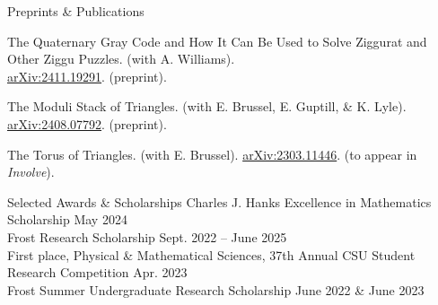 \documentclass[
	11pt, %
]{cv} %
\begin{document}
\begin{rSectionNumbered}{Preprints \& Publications}
	\item The Quaternary Gray Code and How It Can Be Used to Solve Ziggurat and Other Ziggu Puzzles. (with A. Williams).\\ \href{http://arxiv.org/abs/2411.19291}{arXiv:2411.19291}. (preprint).
	\item The Moduli Stack of Triangles. (with E. Brussel, E. Guptill, \& K. Lyle). \href{http://arxiv.org/abs/2408.07792}{arXiv:2408.07792}. (preprint).
	\item The Torus of Triangles. (with E. Brussel). \href{http://arxiv.org/abs/2303.11446}{arXiv:2303.11446}. (to appear in \emph{Involve}).
\end{rSectionNumbered}
\begin{rSection}{Selected Awards \& Scholarships}
	Charles J. Hanks Excellence in Mathematics Scholarship \dotfill May 2024 \\
	Frost Research Scholarship \dotfill Sept. 2022 -- June 2025 \\
	First place, Physical \& Mathematical Sciences, 37th Annual CSU Student Research Competition \dotfill Apr. 2023 \\
	Frost Summer Undergraduate Research Scholarship \dotfill June 2022 \& June 2023
\end{rSection}
\end{document}
